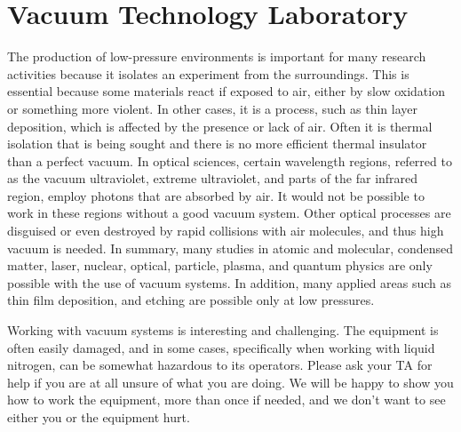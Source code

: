 

%
%


\setcounter{chapter}{10}
\setcounter{equation}{0}
\setcounter{table}{0}
\setcounter{figure}{0}

\chapter{Vacuum Technology Laboratory}

The production of low-pressure environments is important for many research activities because it isolates an experiment from the surroundings. This is essential because some materials react if exposed to air, either by slow oxidation or something more violent. In other cases, it is a process, such as thin layer deposition, which is affected by the presence or lack of air. Often it is thermal isolation that is being sought and there is no more efficient thermal insulator than a perfect vacuum. In optical sciences, certain wavelength regions, referred to as the vacuum ultraviolet, extreme ultraviolet, and parts of the far infrared region, employ photons that are absorbed by air. It would not be possible to work in these regions without a good vacuum system. Other optical processes are disguised or even destroyed by rapid collisions with air molecules, and thus high vacuum is needed. In summary, many studies in atomic and molecular, condensed matter, laser, nuclear, optical, particle, plasma, and quantum physics are only possible with the use of vacuum systems. In addition, many applied areas such as thin film deposition, and etching are possible only at low pressures.

Working with vacuum systems is interesting and challenging. The equipment is often easily damaged, and in some cases, specifically when working with liquid nitrogen, can be somewhat hazardous to its operators. Please ask your TA for help if you are at all unsure of what you are doing. We will be happy to show you how to work the equipment, more than once if needed, and we don't want to see either you or the equipment hurt.

